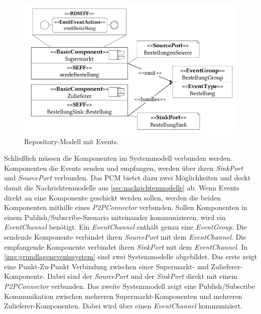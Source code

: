 \begin{figure}
\center
  \includegraphics[width=1\textwidth]{images/grundlagen/grundlagenEventRepo.pdf}
  \caption{Repository-Modell mit Events.}
  \label{img:grundlageneventsrepo}
\end{figure}

Schließlich müssen die Komponenten im Systemmodell verbunden werden. Komponenten die Events senden und empfangen, werden über ihren \emph{SinkPort} und \emph{SourcePort} verbunden. Das PCM bietet dazu zwei Möglichkeiten und deckt damit die Nachrichtenmodelle aus \autoref{sec:nachrichtenmodelle} ab. Wenn Events direkt an eine Komponente geschickt werden sollen, werden die beiden Komponenten mithilfe eines \emph{P2PConnector} verbunden. Sollen Komponenten in einem Publish/Subscribe-Szenario miteinander kommunizieren, wird ein \emph{EventChannel} benötigt. Ein \emph{EventChannel} enthält genau eine \emph{EventGroup}. Die sendende Komponente verbindet ihren \emph{SourcePort} mit dem \emph{EventChannel}. Die empfangende Komponente verbindet ihren \emph{SinkPort} mit dem \emph{EventChannel}. In \autoref{img:grundlageneventssystem} sind zwei Systemmodelle abgebildet. Das erste zeigt eine Punkt-Zu-Punkt Verbindung zwischen einer Supermarkt- und Zulieferer-Komponente. Dabei sind der \emph{SourcePort} und der \emph{SinkPort} direkt mit einem \emph{P2PConnector} verbunden. Das zweite Systemmodell zeigt eine Publish/Subscribe Kommunikation zwischen mehreren Supermarkt-Komponenten und mehreren Zulieferer-Komponenten. Dabei wird über einen \emph{EventChannel} kommuniziert.

